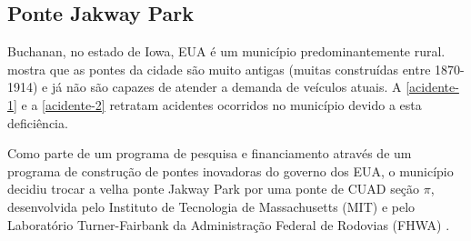 \subsection{Ponte Jakway Park}
\label{chap:jakway}

%
%
%

Buchanan, no estado de Iowa, EUA é um município predominantemente rural.  mostra que as pontes da cidade são muito antigas (muitas construídas entre 1870-1914) e já não são capazes de atender a demanda de veículos atuais. A  \autoref{acidente-1} e a \autoref{acidente-2} retratam acidentes ocorridos no município devido a esta deficiência.


Como parte de um programa de pesquisa e financiamento através de um programa de construção de pontes inovadoras do governo dos EUA, o município decidiu trocar a velha ponte Jakway Park por uma ponte de CUAD seção $ \pi $, desenvolvida pelo Instituto de Tecnologia de Massachusetts (MIT) e pelo Laboratório Turner-Fairbank da Administração Federal de Rodovias (FHWA) \cite{Keierbeler_et_al}.


